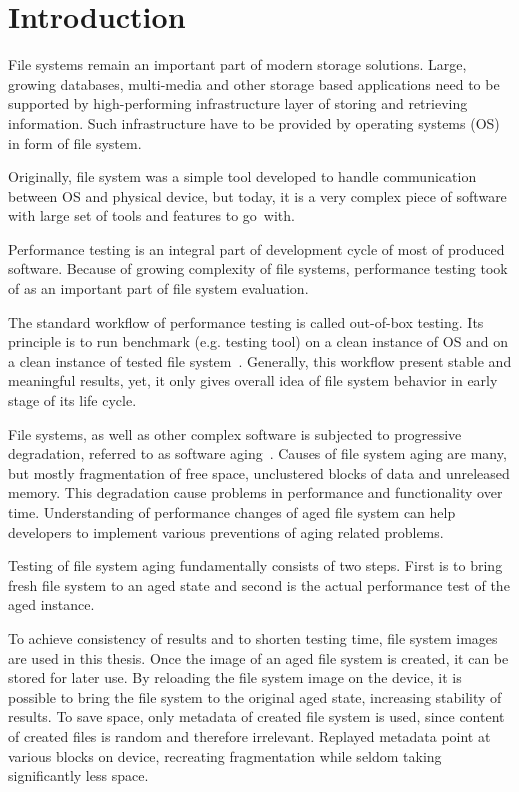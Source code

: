 \documentclass[
  color, %
  table, %
  lof,   %
  lot,   %
]{fithesis3}
\begin{document}
\chapter{Introduction}
File systems remain an important part of modern storage solutions.  Large, growing databases, multi-media and other storage based applications need to be supported by high-performing infrastructure layer of storing and retrieving information. Such infrastructure have to be provided by operating systems (OS) in form of file system.

Originally, file system was a simple tool developed to handle communication between OS and physical device, but today, it is a very complex piece of software with large set of tools and features to go~with.

Performance testing is an integral part of development cycle of most of produced software. Because of growing complexity of file systems, performance testing took of as an important part of file system evaluation.

The standard workflow of performance testing is called out-of-box testing. Its principle is to run benchmark (e.g. testing tool) on a clean instance of OS and on a clean instance of tested file system~\cite{Traeger:2008:NYS:1367829.1367831}. Generally, this workflow present stable and meaningful results, yet, it only gives overall idea of file system behavior in early stage of its life cycle. 

File systems, as well as other complex software is subjected to progressive degradation, referred to as software aging~\cite{Cotroneo:2014:SSA:2543749.2539117}. Causes of file system aging are many, but mostly fragmentation of free space, unclustered blocks of data and unreleased memory. This degradation cause problems in performance and functionality over time. Understanding of performance changes of aged file system can help developers to implement various preventions of aging related problems.

Testing of file system aging fundamentally consists of two steps. First is to bring fresh file system to an aged state and second is the actual performance test of the aged instance.

To achieve consistency of results and to shorten testing time, file system images are used in this thesis. Once the image of an aged file system is created, it can be stored for later use. By reloading the file system image on the device, it is possible to bring the file system to the original aged state, increasing stability of results. To save space, only metadata of created file system is used, since content of created files is random and therefore irrelevant. Replayed metadata point at various blocks on device, recreating fragmentation while seldom taking significantly less space.
\end{document}
